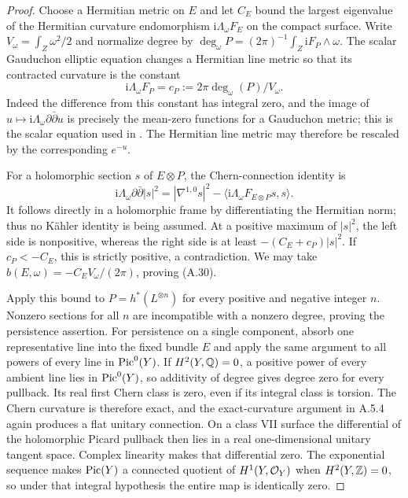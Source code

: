 \begin{proof}
Choose a Hermitian metric on $E$ and let $C_E$ bound the largest eigenvalue of the Hermitian curvature endomorphism $\mathrm i\Lambda_\omega F_E$ on the compact surface. Write $V_\omega=\int_Z\omega^2/2$ and normalize degree by
$\deg_\omega P=(2\pi)^{-1}\int_Z\mathrm iF_P\wedge\omega$.
The scalar Gauduchon elliptic equation changes a Hermitian line metric so that its contracted curvature is the constant
\[
 \mathrm i\Lambda_\omega F_P
       =c_P:=2\pi\deg_\omega(P)/V_\omega.
\]
Indeed the difference from this constant has integral zero, and the image of $u\mapsto\mathrm i\Lambda_\omega\partial\bar\partial u$ is precisely the mean-zero functions for a Gauduchon metric; this is the scalar equation used in \cite[Lemma~2.3]{Teleman2006}. The Hermitian line metric may therefore be rescaled by the corresponding $e^{-u}$.

For a holomorphic section $s$ of $E\otimes P$, the Chern-connection identity is
\[
 \mathrm i\Lambda_\omega\partial\bar\partial|s|^2
 =|\nabla^{1,0}s|^2
  -\langle\mathrm i\Lambda_\omega F_{E\otimes P}s,s\rangle.
\]
It follows directly in a holomorphic frame by differentiating the Hermitian norm; thus no Kähler identity is being assumed. At a positive maximum of $|s|^2$, the left side is nonpositive, whereas the right side is at least
$-(C_E+c_P)|s|^2$.
If $c_P<-C_E$, this is strictly positive, a contradiction. We may take $b(E,\omega)=-C_EV_\omega/(2\pi)$, proving (A.30).

Apply this bound to $P=h^*(L^{\otimes n})$ for every positive and negative integer $n$. Nonzero sections for all $n$ are incompatible with a nonzero degree, proving the persistence assertion. For persistence on a single component, absorb one representative line into the fixed bundle $E$ and apply the same argument to all powers of every line in $\operatorname{Pic}^0(Y)$. If $H^2(Y,\mathbb Q)=0$, a positive power of every ambient line lies in $\operatorname{Pic}^0(Y)$, so additivity of degree gives degree zero for every pullback. Its real first Chern class is zero, even if its integral class is torsion. The Chern curvature is therefore exact, and the exact-curvature argument in A.5.4 again produces a flat unitary connection. On a class VII surface the differential of the holomorphic Picard pullback then lies in a real one-dimensional unitary tangent space. Complex linearity makes that differential zero. The exponential sequence makes $\operatorname{Pic}(Y)$ a connected quotient of $H^1(Y,\mathcal O_Y)$ when $H^2(Y,\mathbb Z)=0$, so under that integral hypothesis the entire map is identically zero.
\end{proof}


